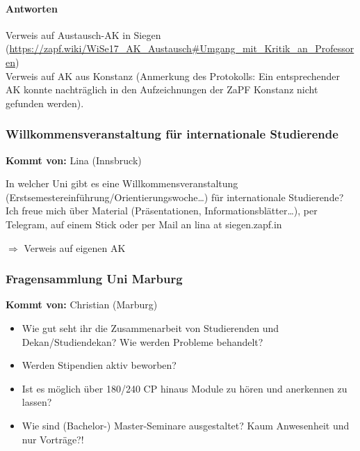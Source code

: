       \paragraph{Antworten}
        Verweis auf Austausch-AK in Siegen (\url{https://zapf.wiki/WiSe17_AK_Austausch#Umgang_mit_Kritik_an_Professoren}) \\
        Verweis auf AK aus Konstanz (Anmerkung des Protokolls: Ein entsprechender AK konnte nachträglich in den Aufzeichnungen der ZaPF Konstanz nicht gefunden werden).

    \subsubsection*{Willkommensveranstaltung für internationale Studierende}
      \textbf{Kommt von:} Lina (Innsbruck)

      In welcher Uni gibt es eine Willkommensveranstaltung (Erstsemestereinführung/Orientierungswoche…) für internationale Studierende?
      Ich freue mich über Material (Präsentationen, Informationsblätter…), per Telegram, auf einem Stick oder per Mail an lina at siegen.zapf.in

    $\Rightarrow$ Verweis auf eigenen AK

    \subsubsection*{Fragensammlung Uni Marburg}
      \textbf{Kommt von:} Christian (Marburg)
        \begin{itemize}
          \item Wie gut seht ihr die Zusammenarbeit von Studierenden und Dekan/Studiendekan? Wie werden Probleme behandelt?
          \item Werden Stipendien aktiv beworben?
          \item Ist es möglich über 180/240 CP hinaus Module zu hören und anerkennen zu lassen?
          \item Wie sind (Bachelor-) Master-Seminare ausgestaltet? Kaum Anwesenheit und nur Vorträge?!
        \end{itemize}

